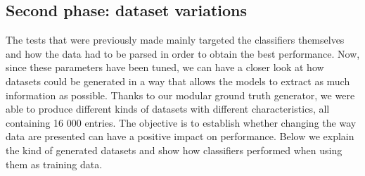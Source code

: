 
\subsection{Second phase: dataset variations}

The tests that were previously made mainly targeted the classifiers themselves and how the data had to be parsed in order to obtain the best performance. Now, since these parameters have been tuned, we can have a closer look at how datasets could be generated in a way that allows the models to extract as much information as possible. Thanks to our modular ground truth generator, we were able to produce different kinds of datasets with different characteristics, all containing 16 000 entries. The objective is to establish whether changing the way data are presented can have a positive impact on performance. Below we explain the kind of generated datasets and show how classifiers performed when using them as training data. 
